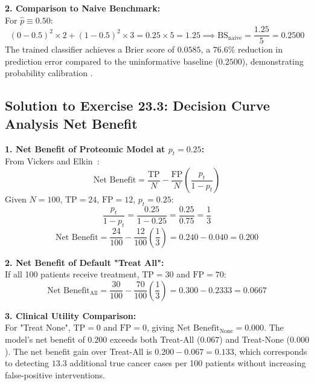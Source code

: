 \documentclass[11pt,oneside]{book}
\begin{document}
\textbf{2. Comparison to Naive Benchmark:}\\
For $\hat{p} \equiv 0.50$:
$$(0 - 0.5)^2 \times 2 + (1 - 0.5)^2 \times 3 = 0.25 \times 5 = 1.25 \implies \text{BS}_{\text{naive}} = \frac{1.25}{5} = 0.2500$$
The trained classifier achieves a Brier score of $0.0585$, a $76.6\%$ reduction in prediction error compared to the uninformative baseline ($0.2500$), demonstrating probability calibration \cite{brier1950verification}.

\subsection*{Solution to Exercise 23.3: Decision Curve Analysis Net Benefit}

\textbf{1. Net Benefit of Proteomic Model at $p_t = 0.25$:}\\
From Vickers and Elkin~\cite{vickers2006decision}:
$$\text{Net Benefit} = \frac{\text{TP}}{N} - \frac{\text{FP}}{N}\left(\frac{p_t}{1 - p_t}\right)$$
Given $N = 100$, $\text{TP} = 24$, $\text{FP} = 12$, $p_t = 0.25$:
$$\frac{p_t}{1 - p_t} = \frac{0.25}{1 - 0.25} = \frac{0.25}{0.75} = \frac{1}{3}$$
$$\text{Net Benefit} = \frac{24}{100} - \frac{12}{100}\left(\frac{1}{3}\right) = 0.240 - 0.040 = 0.200$$

\textbf{2. Net Benefit of Default "Treat All":}\\
If all 100 patients receive treatment, $\text{TP} = 30$ and $\text{FP} = 70$:
$$\text{Net Benefit}_{\text{All}} = \frac{30}{100} - \frac{70}{100}\left(\frac{1}{3}\right) = 0.300 - 0.2333 = 0.0667$$

\textbf{3. Clinical Utility Comparison:}\\
For "Treat None", $\text{TP} = 0$ and $\text{FP} = 0$, giving $\text{Net Benefit}_{\text{None}} = 0.000$.
The model's net benefit of $0.200$ exceeds both Treat-All ($0.067$) and Treat-None ($0.000$). The net benefit gain over Treat-All is $0.200 - 0.067 = 0.133$, which corresponds to detecting $13.3$ additional true cancer cases per 100 patients without increasing false-positive interventions.

\clearpage
\end{document}
